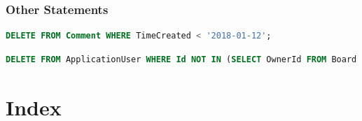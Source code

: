 \documentclass[letterpaper]{article}
\begin{document}
\subsubsection{Other Statements}

\begin{lstlisting}[language=SQL, caption=Delete All Comments Prior to A Given Date]
DELETE FROM Comment WHERE TimeCreated < '2018-01-12';
\end{lstlisting}
\begin{lstlisting}[language=SQL, caption=Delete Inactive Users]
DELETE FROM ApplicationUser WHERE Id NOT IN (SELECT OwnerId FROM Board UNION SELECT MemberId FROM BoardMember UNION SELECT OwnerId FROM  Comment UNION  SELECT AssigneeId FROM TaskAssignee);
\end{lstlisting}

\section{Index}
\lstlistoflistings
\end{document}
